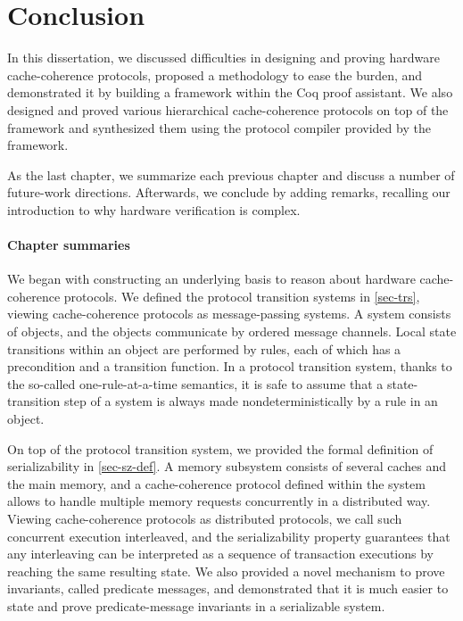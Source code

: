 \chapter*{Conclusion}

In this dissertation, we discussed difficulties in designing and proving hardware cache-coherence protocols, proposed a methodology to ease the burden, and demonstrated it by building a framework \hemiola{} within the Coq proof assistant.
We also designed and proved various hierarchical cache-coherence protocols on top of the framework and synthesized them using the protocol compiler provided by the framework.

As the last chapter, we summarize each previous chapter and discuss a number of future-work directions.
Afterwards, we conclude by adding remarks, recalling our introduction to why hardware verification is complex.

\subsubsection{Chapter summaries}

We began with constructing an underlying basis to reason about hardware cache-coherence protocols.
We defined the protocol transition systems in \autoref{sec-trs}, viewing cache-coherence protocols as message-passing systems.
A system consists of objects, and the objects communicate by ordered message channels.
Local state transitions within an object are performed by rules, each of which has a precondition and a transition function.
In a protocol transition system, thanks to the so-called one-rule-at-a-time semantics, it is safe to assume that a state-transition step of a system is always made nondeterministically by a rule in an object.

On top of the protocol transition system, we provided the formal definition of serializability in \autoref{sec-sz-def}.
A memory subsystem consists of several caches and the main memory, and a cache-coherence protocol defined within the system allows to handle multiple memory requests concurrently in a distributed way.
Viewing cache-coherence protocols as distributed protocols, we call such concurrent execution interleaved, and the serializability property guarantees that any interleaving can be interpreted as a sequence of transaction executions by reaching the same resulting state.
We also provided a novel mechanism to prove invariants, called predicate messages, and demonstrated that it is much easier to state and prove predicate-message invariants in a serializable system.

